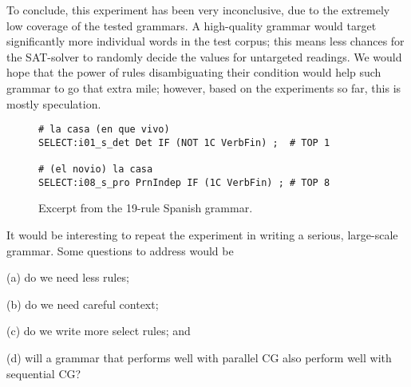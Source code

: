 To conclude, this experiment has been very inconclusive, due to the extremely low coverage 
of the tested grammars.
A high-quality grammar would target significantly more individual words in the test corpus;
this means less chances for the SAT-solver to randomly decide the values for untargeted readings. We would hope that the power of rules disambiguating their condition would help 
such grammar to go that extra mile; however, based on the experiments so far, this is mostly speculation.

\begin{figure}[ht]
\centering
\begin{verbatim}
# la casa (en que vivo)
SELECT:i01_s_det Det IF (NOT 1C VerbFin) ;  # TOP 1

# (el novio) la casa
SELECT:i08_s_pro PrnIndep IF (1C VerbFin) ; # TOP 8    
\end{verbatim}
\label{fig:rulesAreBiased}
\caption{Excerpt from the 19-rule Spanish grammar.}
\end{figure}

It would be interesting to repeat the experiment in writing a serious, large-scale grammar.
Some questions to address would be 
\begin{inparaenum}
\item[(a)] do we need less rules;
\item[(b)] do we need careful context;
\item[(c)] do we write more {\sc select} rules; and
\item[(d)] will a grammar that performs well with parallel CG also perform well with sequential CG?
\end{inparaenum}








